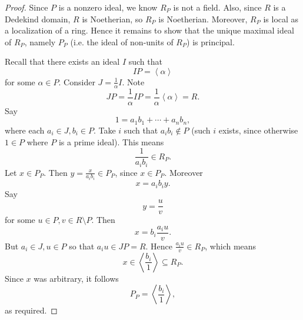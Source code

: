 \documentclass[pmath441]{subfiles}
\begin{document}
    \begin{proof}
        Since $P$ is a nonzero ideal, we know $R_P$ is not a field. Also, since $R$ is a Dedekind domain, $R$ is Noetherian, so $R_P$ is Noetherian. Moreover, $R_P$ is local as a localization of a ring. Hence it remains to show that the unique maximal ideal of $R_P$, namely $P_P$ (i.e. the ideal of non-units of $R_P$) is principal.

        Recall that there exists an ideal $I$ such that
        \begin{equation*}
            IP = \left< \alpha \right> 
        \end{equation*}
        for some $\alpha\in P$. Consider $J = \frac{1}{\alpha}I$. Note
        \begin{equation*}
            JP = \frac{1}{\alpha}IP = \frac{1}{\alpha}\left< \alpha \right> = R. 
        \end{equation*}
        Say
        \begin{equation*}
            1 = a_1b_1+\cdots+a_nb_n,
        \end{equation*}
        where each $a_i\in J, b_i\in P$. Take $i$ such that $a_ib_i\notin P$ (such $i$ exists, since otherwise $1\in P$ where $P$ is a prime ideal). This means
        \begin{equation*}
            \frac{1}{a_ib_i}\in R_P.
        \end{equation*}
        Let $x\in P_P$. Then $y=\frac{x}{a_ib_i}\in P_P$, since $x\in P_P$. Moreover
        \begin{equation*}
            x = a_ib_i y.
        \end{equation*}
        Say
        \begin{equation*}
            y = \frac{u}{v}
        \end{equation*}
        for some $u\in P, v\in R\setminus P$. Then
        \begin{equation*}
            x = b_i \frac{a_iu}{v}.
        \end{equation*}
        But $a_i\in J, u\in P$ so that $a_iu\in JP=R$. Hence $\frac{a_iu}{v}\in R_P$, which means
        \begin{equation*}
            x\in \left< \frac{b_i}{1} \right>\subseteq R_P. 
        \end{equation*}
        Since $x$ was arbitrary, it follows
        \begin{equation*}
            P_P = \left< \frac{b_i}{1} \right>, 
        \end{equation*}
        as required.
    \end{proof}
\end{document}
